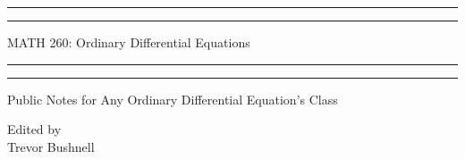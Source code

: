 \documentclass{package/notes}
\begin{document}
	\begin{titlepage} %
		
		\centering %
		
		\scshape %
		
		\vspace*{\baselineskip} %
		
		
		\rule{\textwidth}{1.6pt}\vspace*{-\baselineskip}\vspace*{2pt} %
		\rule{\textwidth}{0.4pt} %
		
		\vspace{0.75\baselineskip} %
		
		{\huge MATH 260: Ordinary Differential Equations\\} %
		
		\vspace{0.75\baselineskip} %
		
		\rule{\textwidth}{0.4pt}\vspace*{-\baselineskip}\vspace{3.2pt} %
		\rule{\textwidth}{1.6pt} %
		
		\vspace{2\baselineskip} %
		
		
		\LARGE{Public Notes for Any Ordinary Differential Equation's Class} 
		
		\vspace*{3\baselineskip} %
		
		
		
		\vspace{0.5\baselineskip} 
		
		
		\vspace{0.5\baselineskip} 
		
		\vfill 
		
		
		
		\vspace{0.3\baselineskip} 
		
		
		{\large Edited by\\  Trevor Bushnell} 
		
	\end{titlepage}
	\tableofcontents
\end{document}
